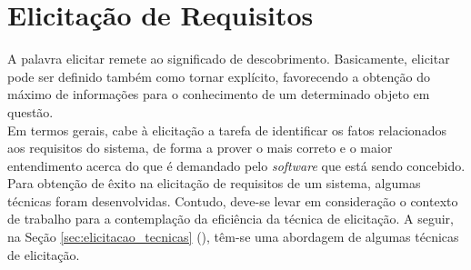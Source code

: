 \chapter[Elicitação de Requisitos]{Elicitação de Requisitos}
\label{chap:elicitacao}
	A palavra elicitar remete ao significado de descobrimento. Basicamente, elicitar pode ser definido também como tornar explícito, favorecendo a obtenção do máximo de informações para o conhecimento de um determinado objeto em questão.
	\\ \indent Em termos gerais, cabe à elicitação a tarefa de identificar os fatos relacionados aos requisitos do sistema, de forma a prover o mais correto e o maior entendimento acerca do que é demandado pelo \emph{software} que está sendo concebido.
	\\ \indent Para obtenção de êxito na elicitação de requisitos de um sistema, algumas técnicas foram desenvolvidas. Contudo, deve-se levar em consideração o contexto de trabalho para a contemplação da eficiência da técnica de elicitação. A seguir, na Seção \ref{sec:elicitacao_tecnicas} (), têm-se uma abordagem de algumas técnicas de elicitação.

